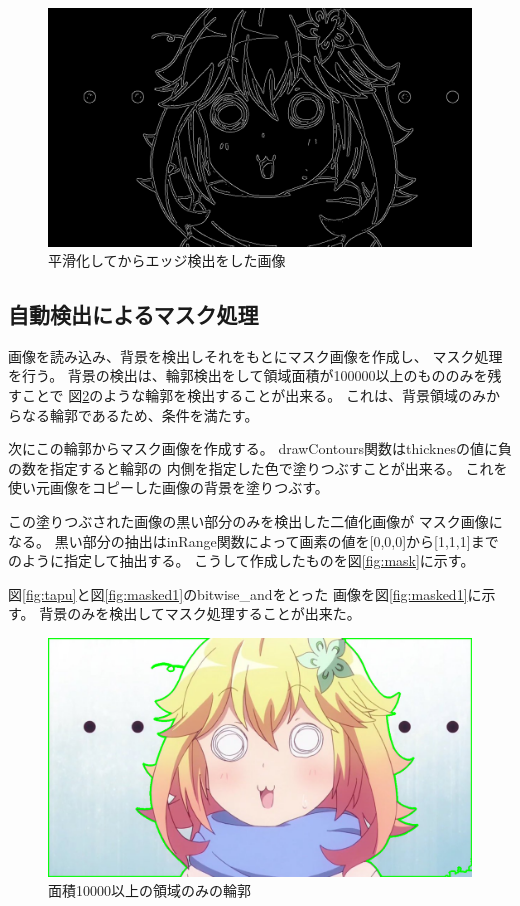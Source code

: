 \documentclass[dvipdfmx]{jsarticle}
\begin{document}
\begin{figure}[htbp]
  \centering
  \includegraphics[width=0.7\hsize]{../pic/canny2.png}
  \caption{平滑化してからエッジ検出をした画像}
  \label{fig:canny2}
\end{figure}

\newpage
\subsection{自動検出によるマスク処理}

画像を読み込み、背景を検出しそれをもとにマスク画像を作成し、
マスク処理を行う。
背景の検出は、輪郭検出をして領域面積が100000以上のもののみを残すことで
図\ref{fig:contour_large}のような輪郭を検出することが出来る。
これは、背景領域のみからなる輪郭であるため、条件を満たす。

次にこの輪郭からマスク画像を作成する。
drawContours関数はthicknesの値に負の数を指定すると輪郭の
内側を指定した色で塗りつぶすことが出来る。
これを使い元画像をコピーした画像の背景を塗りつぶす。

この塗りつぶされた画像の黒い部分のみを検出した二値化画像が
マスク画像になる。
黒い部分の抽出はinRange関数によって画素の値を[0,0,0]から[1,1,1]まで
のように指定して抽出する。
こうして作成したものを図\ref{fig:mask}に示す。

図\ref{fig:tapu}と図\ref{fig:masked1}のbitwise\_andをとった
画像を図\ref{fig:masked1}に示す。
背景のみを検出してマスク処理することが出来た。

\begin{figure}[H]
  \centering
  \includegraphics[width=0.7\hsize]{../pic/contour_large.png}
  \caption{面積10000以上の領域のみの輪郭}
  \label{fig:contour_large}
\end{figure}
\end{document}
